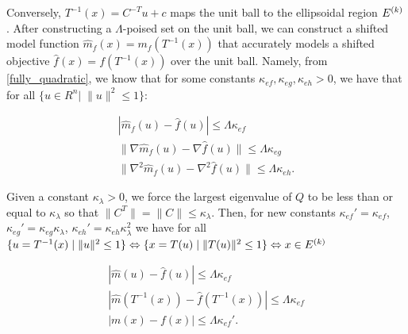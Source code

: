 Conversely, $T^{-1}(x) = C^{-T}u + c$ maps the unit ball to the ellipsoidal region $ {E^{(k)}} $.
After constructing a $\Lambda$-poised set on the unit ball, we can construct a shifted model function
$\hat m_f(x) = m_f(T^{-1}(x))$ that accurately models a shifted objective $\hat f(x) = f(T^{-1}(x))$ over the unit ball.
Namely, from \cref{fully_quadratic}, we know that for some constants $\kappa_{ef}, \kappa_{eg}, \kappa_{eh} > 0$, we have that for all $\{u \in R^n | \;\|u\|^2 \le 1\}$:
 
\begin{align*}
|\hat m_f(u) - \hat f(u)| \le \Lambda \kappa_{ef}  \\
\|\nabla \hat m_f(u) - \nabla \hat f(u)\| \le \Lambda \kappa_{eg} \\
\|\nabla^2 \hat m_f(u) - \nabla^2 \hat f(u)\| \le \Lambda \kappa_{eh}.
\end{align*}

Given a constant $\kappa_{\lambda} > 0$, we force the largest eigenvalue of $Q$ to be less than or equal to $\kappa_{\lambda}$ 
so that $\|C^{T}\| = \|C\| \le \kappa_{\lambda}$.
Then, for new constants $\kappa_{ef} ' = \kappa_{ef} $, $ \kappa_{eg}' = {\kappa_{eg}}{\kappa_{\lambda}}$, $\kappa_{eh}' = {\kappa_{eh}}{\kappa_{\lambda}^2}$ we have
for all $\{u = T^{-1}(x) \; | \; \|u\|^2 \le 1 \} \Leftrightarrow \{x = T(u) \; | \; \|T(u)\|^2 \le 1 \} \Leftrightarrow x \in {E^{(k)}}$

\begin{align*}
|\hat m(u) - \hat f(u)| \le \Lambda \kappa_{ef} \\
|\hat m(T^{-1}(x)) - \hat f(T^{-1}(x))| \le \Lambda \kappa_{ef} \\
| m(x) - f(x)| \le \Lambda \kappa_{ef}'.
\end{align*}

